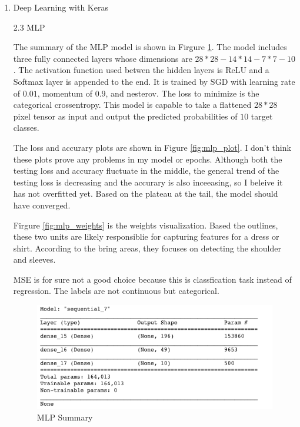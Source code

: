 \documentclass[11pt]{article}
\begin{document}
\begin{enumerate}
\item
Deep Learning with Keras

2.3 MLP
\medskip

The summary of the MLP model is shown in Firgure \ref{fig:mlp_summary}. The model includes three fully connected layers whose dimensions are $28*28-14*14-7*7-10$. The activation function used betwen the hidden layers is ReLU and a Softmax layer is appended to the end. It is trained by SGD with learning rate of $0.01$, momentum of $0.9$, and nesterov. The loss to minimize is the categorical crossentropy. This model is capable to take a flattened $28*28$ pixel tensor as input and output the predicted probabilities of $10$ target classes.

The loss and accurary plots are shown in Figure \ref{fig:mlp_plot}. I don't think these plots prove any problems in my model or epochs. Although both the testing loss and accuracy fluctuate in the middle, the general trend of the testing loss is decreasing and the accurary is also inceeasing, so I beleive it has not overfitted yet. Based on the plateau at the tail, the model should have converged.

Firgure \ref{fig:mlp_weights} is the weights visualization. Based the outlines, these two units are likely responsiblie for capturing features for a dress or shirt. According to the bring areas, they focuses on detecting the shoulder and sleeves.

MSE is for sure not a good choice because this is classfication task instead of regression. The labels are not continuous but categorical.



\begin{figure}[!h]
  \centering
  \includegraphics[width=0.8\linewidth]{figures/mlp/summary.png}
  \caption{MLP Summary}
  \label{fig:mlp_summary}
\end{figure}


\end{enumerate}
\end{document}
